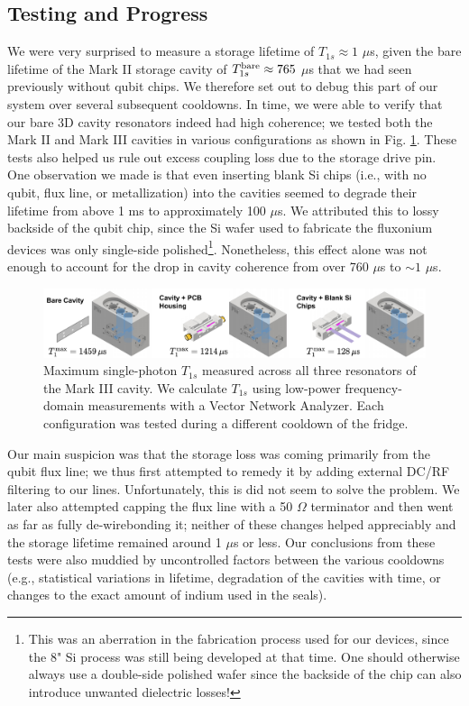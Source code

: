 \subsection{Testing and Progress}
We were very surprised to measure a storage lifetime of $T_{1s} \approx 1$ $\mu$s, given the bare lifetime of the Mark II storage cavity of $T_{1s}^{\rm bare} \approx 765$ $\mu$s that we had seen previously without qubit chips. We therefore set out to debug this part of our system over several subsequent cooldowns. In time, we were able to verify that our bare 3D cavity resonators indeed had high coherence; we tested both the Mark II and Mark III cavities in various configurations as shown in Fig. \ref{fig:4_3D_Cavity_Debugging}. These tests also helped us rule out excess coupling loss due to the storage drive pin. One observation we made is that even inserting blank Si chips (i.e., with no qubit, flux line, or metallization) into the cavities seemed to degrade their lifetime from above 1 ms to approximately 100 $\mu$s. We attributed this to lossy backside of the qubit chip, since the Si wafer used to fabricate the fluxonium devices was only single-side polished\footnote{This was an aberration in the fabrication process used for our devices, since the 8" Si process was still being developed at that time. One should otherwise always use a double-side polished wafer since the backside of the chip can also introduce unwanted dielectric losses!}. Nonetheless, this effect alone was not enough to account for the drop in cavity coherence from over 760 $\mu$s to $\sim\!1$ $\mu$s. 

\begin{figure}[t]
    \centering
    \includegraphics[width=\linewidth]{Figures/4/3D_Cavity_Debugging.pdf}
    \caption[Attempts to debug low storage lifetime in different configurations.]{Maximum single-photon $T_{1s}$ measured across all three resonators of the Mark III cavity. We calculate $T_{1s}$ using low-power frequency-domain measurements with a Vector Network Analyzer. Each configuration was tested during a different cooldown of the fridge.}
    \label{fig:4_3D_Cavity_Debugging}
\end{figure}

Our main suspicion was that the storage loss was coming primarily from the qubit flux line; we thus first attempted to remedy it by adding external DC/RF filtering to our lines. Unfortunately, this is did not seem to solve the problem. We later also attempted capping the flux line with a 50 $\Omega$ terminator and then went as far as fully de-wirebonding it; neither of these changes helped appreciably and the storage lifetime remained around 1 $\mu$s or less. Our conclusions from these tests were also muddied by uncontrolled factors between the various cooldowns (e.g., statistical variations in lifetime, degradation of the cavities with time, or changes to the exact amount of indium used in the seals). 

